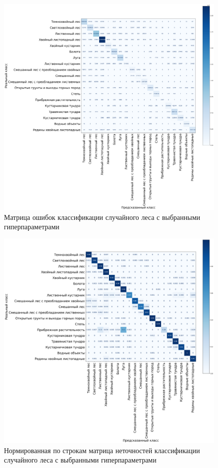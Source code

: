\documentclass[14pt, a4paper, oneside]{extarticle}
\begin{document}
\begin{figure}[H]
    \caption{Матрица ошибок классификации случайного леса с выбранными гиперпараметрами}
    \centering
    \includegraphics[scale=0.27]{confusion-matrix-3}
\end{figure}

\begin{figure}[H]
    \caption{Нормированная по строкам матрица неточностей классификации случайного леса с выбранными гиперпараметрами}
    \centering
    \includegraphics[scale=0.33]{confusion-matrix-4}
\end{figure}
\newpage
\end{document}

